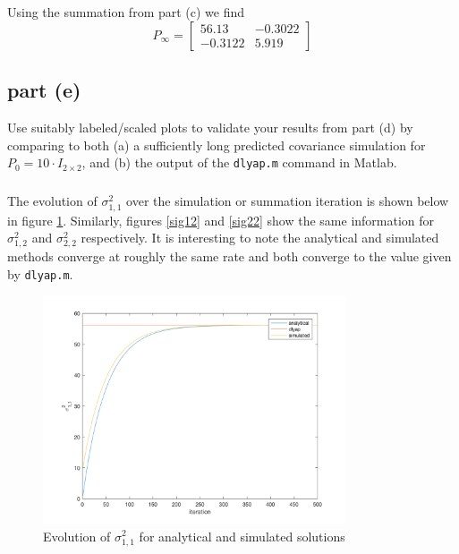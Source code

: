 \documentclass[11pt]{article}
\begin{document}
\subparagraph*{}
Using the summation from part (c) we find 
\begin{equation*}
	P_\infty = \begin{bmatrix} 56.13 & -0.3022 \\ -0.3122 & 5.919 \end{bmatrix}
\end{equation*}

\subsection*{part (e)}
Use suitably labeled/scaled plots to validate your results from part (d) by comparing to both (a) a sufficiently long predicted covariance simulation for $P_0=10\cdot I_{2\times 2}$, and (b) the output of the \texttt{dlyap.m} command in Matlab.

\subparagraph*{}
The evolution of $\sigma_{1,1}^2$ over the simulation or summation iteration is shown below in figure \ref{sig11}. Similarly, figures \ref{sig12} and \ref{sig22} show the same information for $\sigma_{1,2}^2$ and $\sigma_{2,2}^2$ respectively. It is interesting to note the analytical and simulated methods converge at roughly the same rate and both converge to the value given by \texttt{dlyap.m}.
\begin{figure}[h]
	\centering
	\includegraphics[width=0.8\textwidth]{prob4e_plt1.png}
	\caption{Evolution of $\sigma_{1,1}^2$ for analytical and simulated solutions}
	\label{sig11}
\end{figure}
\end{document}
